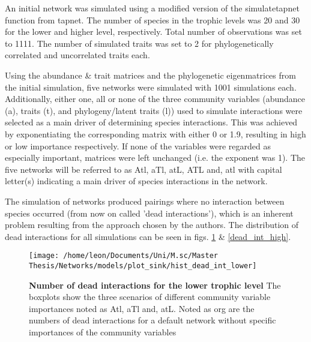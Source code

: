 \documentclass[12pt,a4paper]{article}
\begin{document}
	
	An initial network was simulated using a modified version of the simulatetapnet function from tapnet. The number of species in the trophic levels was 20 and 30 for the lower and higher level, respectively. Total number of observations was set to 1111. The number of simulated traits was set to 2 for phylogenetically correlated and uncorrelated traits each.
	

	Using the abundance \& trait matrices and the phylogenetic eigenmatrices from the initial simulation, five networks were simulated with 1001 simulations each. Additionally, either one, all or none of the three community variables (abundance (a), traits (t), and phylogeny/latent traits (l)) used to simulate interactions were selected as a main driver of determining species interactions. This was achieved by exponentiating the corresponding matrix with either 0 or 1.9, resulting in high or low importance respectively. If none of the variables were regarded as especially important, matrices were left unchanged (i.e. the exponent was 1). The five networks will be referred to as Atl, aTl, atL, ATL and, atl with capital letter(s) indicating a main driver of species interactions in the network.
	
	 The simulation of networks produced pairings where no interaction between species occurred (from now on called 'dead interactions'), which is an inherent problem resulting from the approach chosen by the authors. The distribution of dead interactions for all simulations can be seen in figs. \ref{dead_int_low} \& \ref{dead_int_high}. 

\begin{figure}[H]
	 \texttt{[image: /home/leon/Documents/Uni/M.sc/Master Thesis/Networks/models/plot\_sink/hist\_dead\_int\_lower]}
	 \caption{\textbf{Number of dead interactions for the lower trophic level} The boxplots show the three scenarios of different community variable importances noted as Atl, aTl and, atL. Noted as org are the numbers of dead interactions for a default network without specific importances of the community variables}
	 \label{dead_int_low}
\end{figure}
\end{document}
